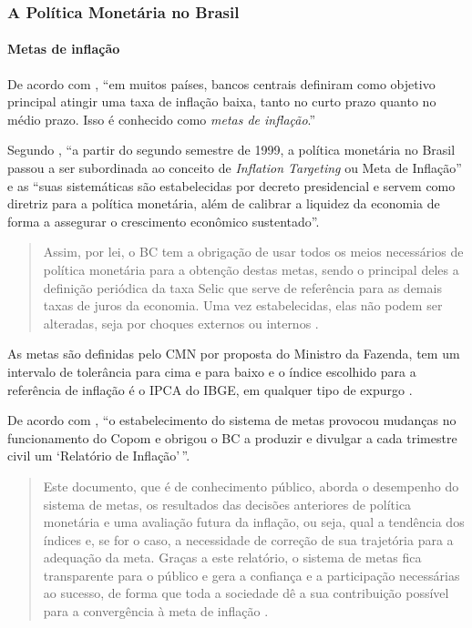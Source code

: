 \documentclass[]{article}
\let\oldparagraph\paragraph
\renewcommand{\paragraph}[1]{\oldparagraph{#1}\mbox{}}
\begin{document}
\subsubsection{A Política Monetária no Brasil}\label{subsec:pol_mon_br}

\paragraph{Metas de inflação}\label{metas-de-inflacao}

De acordo com , ``em muitos países, bancos
centrais definiram como objetivo principal atingir uma taxa de inflação
baixa, tanto no curto prazo quanto no médio prazo. Isso é conhecido como
\emph{metas de inflação}.''

Segundo , ``a partir do segundo semestre
de 1999, a política monetária no Brasil passou a ser subordinada ao
conceito de \emph{Inflation Targeting} ou Meta de Inflação'' e as ``suas
sistemáticas são estabelecidas por decreto presidencial e servem como
diretriz para a política monetária, além de calibrar a liquidez da
economia de forma a assegurar o crescimento econômico sustentado''.

\begin{quote}
Assim, por lei, o BC tem a obrigação de usar todos os meios necessários
de política monetária para a obtenção destas metas, sendo o principal
deles a definição periódica da taxa Selic que serve de referência para
as demais taxas de juros da economia. Uma vez estabelecidas, elas não
podem ser alteradas, seja por choques externos ou internos
\cite[p.~60]{fortuna2015}.
\end{quote}

As metas são definidas pelo CMN por proposta do Ministro da Fazenda, tem
um intervalo de tolerância para cima e para baixo e o índice escolhido
para a referência de inflação é o IPCA do IBGE, em qualquer tipo de
expurgo \cite[p.~60]{fortuna2015}.

De acordo com , ``o estabelecimento do
sistema de metas provocou mudanças no funcionamento do Copom e obrigou o
BC a produzir e divulgar a cada trimestre civil um `Relatório de
Inflação'\,''.

\begin{quote}
Este documento, que é de conhecimento público, aborda o desempenho do
sistema de metas, os resultados das decisões anteriores de política
monetária e uma avaliação futura da inflação, ou seja, qual a tendência
dos índices e, se for o caso, a necessidade de correção de sua
trajetória para a adequação da meta. Graças a este relatório, o sistema
de metas fica transparente para o público e gera a confiança e a
participação necessárias ao sucesso, de forma que toda a sociedade dê a
sua contribuição possível para a convergência à meta de inflação
\cite[p.60-61]{fortuna2015}.
\end{quote}
\end{document}

